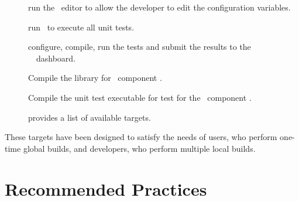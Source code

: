 \begin{description}
\item[] run the \cmake\ editor to allow the developer to edit the configuration variables. 
\item[] run \ctest\ to execute all unit tests.
\item[] configure, compile, run the tests and submit the results to the \draco\ \cdash\ dashboard.
\item[] Compile the library for \draco\ component .
\item[] Compile the unit test executable for test  for the \draco\ component .
\item[] provides a list of available targets.
\end{description}
These targets have been designed to satisfy the needs of users, who
perform one-time global builds, and developers, who perform multiple
local builds.


\section{Recommended Practices}

